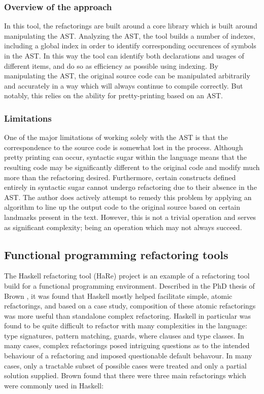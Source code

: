 \subsubsection{Overview of the approach}
In this tool, the refactorings are built around a core library which is built around manipulating the AST. Analyzing the AST, the tool builds a number of indexes, including a global index in order to identify corresponding occurences of symbols in the AST. In this way the tool can identify both declarations and usages of different items, and do so as efficiency as possible using indexing. By manipulating the AST, the original source code can be manipulated arbitrarily and accurately in a way which will always continue to compile correctly. But notably, this relies on the ability for pretty-printing based on an AST.

\subsubsection{Limitations}
One of the major limitations of working solely with the AST is that the correspondence to the source code is somewhat lost in the process. Although pretty printing can occur, syntactic sugar within the language means that the resulting code may be significantly different to the original code and modify much more than the refactoring desired. Furthermore, certain constructs defined entirely in syntactic sugar cannot undergo refactoring due to their absence in the AST. The author does actively attempt to remedy this problem by applying an algorithm to line up the output code to the original source based on certain landmarks present in the text. However, this is not a trivial operation and serves as significant complexity; being an operation which may not always succeed.

\subsection{Functional programming refactoring tools}
The Haskell refactoring tool (HaRe) project is an example of a refactoring tool build for a functional programming environment. Described in the PhD thesis of Brown \cite{brown2008tool}, it was found that Haskell mostly helped facilitate simple, atomic refactorings, and based on a case study, composition of these atomic refactorings was more useful than standalone complex refactoring. Haskell in particular was found to be quite difficult to refactor with many complexities in the language: type signatures, pattern matching, guards, where clauses and type classes. In many cases, complex refactorings posed intriguing questions as to the intended behaviour of a refactoring and imposed questionable default behavour. In many cases, only a tractable subset of possible cases were treated and only a partial solution supplied. Brown found that there were three main refactorings which were commonly used in Haskell: 

